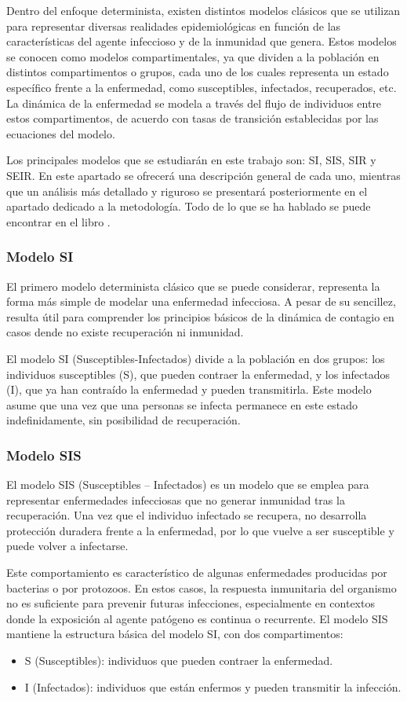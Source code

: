 \begin{enumerate}
Dentro del enfoque determinista, existen distintos modelos clásicos que se utilizan para representar diversas realidades epidemiológicas en función de las características del agente infeccioso y de la inmunidad que genera. Estos modelos se conocen como modelos compartimentales, ya que dividen a la población en distintos compartimentos o grupos, cada uno de los cuales representa un estado específico frente a la enfermedad, como susceptibles, infectados, recuperados, etc. La dinámica de la enfermedad se modela a través del flujo de individuos entre estos compartimentos, de acuerdo con tasas de transición establecidas por las ecuaciones del modelo.

Los principales modelos que se estudiarán en este trabajo son: SI, SIS, SIR y SEIR. En este apartado se ofrecerá una descripción general de cada uno, mientras que un análisis más detallado y riguroso se presentará posteriormente en el apartado dedicado a la metodología. Todo de lo que se ha hablado se puede encontrar en el libro \cite{allen2008mathematical}.

\subsubsection*{Modelo SI}
El primero modelo determinista clásico que se puede considerar, representa la forma más simple de modelar una enfermedad infecciosa. A pesar de su sencillez, resulta útil para comprender los principios básicos de la dinámica de contagio en casos dende no existe recuperación ni inmunidad.

El modelo SI (Susceptibles-Infectados) divide a la población en dos grupos: los individuos susceptibles (S), que pueden contraer la enfermedad, y los infectados (I), que ya han contraído la enfermedad y pueden transmitirla. Este modelo asume que una vez que una personas se infecta permanece en este estado indefinidamente, sin posibilidad de recuperación.


\subsubsection*{Modelo SIS}
El modelo SIS (Susceptibles – Infectados) es un modelo que se emplea para representar enfermedades infecciosas que no generar inmunidad tras la recuperación. Una vez que el individuo infectado se recupera, no desarrolla protección duradera frente a la enfermedad, por lo que vuelve a ser susceptible y puede volver a infectarse.

Este comportamiento es característico de algunas enfermedades producidas por bacterias o por protozoos. En estos casos, la respuesta inmunitaria del organismo no es suficiente para prevenir futuras infecciones, especialmente en contextos donde la exposición al agente patógeno es continua o recurrente.
El modelo SIS mantiene la estructura básica del modelo SI, con dos compartimentos:
\begin{itemize}
    \item S (Susceptibles): individuos que pueden contraer la enfermedad.
    \item I (Infectados): individuos que están enfermos y pueden transmitir la infección.
\end{itemize}


\end{enumerate}
